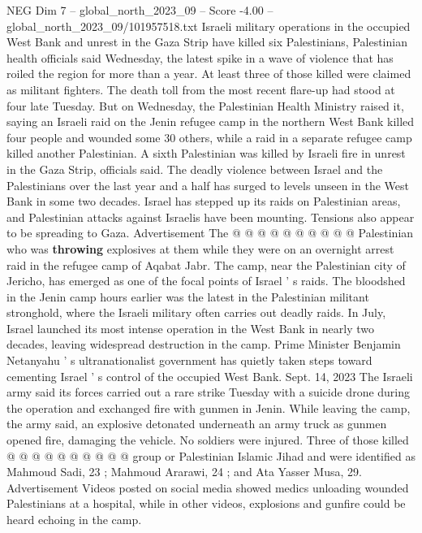 \begin{textsample}{NEG Dim 7 – global\_north\_2023\_09 – Score -4.00 – global\_north\_2023\_09/101957518.txt}  \label{ex:f7_neg_164}
Israeli military operations in the occupied West Bank and unrest in the Gaza Strip have killed six Palestinians, Palestinian health officials said Wednesday, the latest spike in a wave of violence that has roiled the region for more than a year.
At least three of those killed were claimed as militant fighters.
The death toll from the most recent flare-up had stood at four late Tuesday.
But on Wednesday, the Palestinian Health Ministry raised it, saying an Israeli raid on the Jenin refugee camp in the northern West Bank killed four people and wounded some 30 others, while a raid in a separate refugee camp killed another Palestinian.
A sixth Palestinian was killed by Israeli fire in unrest in the Gaza Strip, officials said.
The deadly violence between Israel and the Palestinians over the last year and a half has surged to levels unseen in the West Bank in some two decades.
Israel has stepped up its raids on Palestinian areas, and Palestinian attacks against Israelis have been mounting.
Tensions also appear to be spreading to Gaza.
Advertisement The @ @ @ @ @ @ @ @ @ @ Palestinian who was \textbf{throwing} explosives at them while they were on an overnight arrest raid in the refugee camp of Aqabat Jabr.
The camp, near the Palestinian city of Jericho, has emerged as one of the focal points of Israel ' s raids.
The bloodshed in the Jenin camp hours earlier was the latest in the Palestinian militant stronghold, where the Israeli military often carries out deadly raids.
In July, Israel launched its most intense operation in the West Bank in nearly two decades, leaving widespread destruction in the camp.
Prime Minister Benjamin Netanyahu ' s ultranationalist government has quietly taken steps toward cementing Israel ' s control of the occupied West Bank.
Sept. 14, 2023 The Israeli army said its forces carried out a rare strike Tuesday with a suicide drone during the operation and exchanged fire with gunmen in Jenin.
While leaving the camp, the army said, an explosive detonated underneath an army truck as gunmen opened fire, damaging the vehicle.
No soldiers were injured.
Three of those killed @ @ @ @ @ @ @ @ @ @ group or Palestinian Islamic Jihad and were identified as Mahmoud Sadi, 23 ; Mahmoud Ararawi, 24 ; and Ata Yasser Musa, 29.
Advertisement Videos posted on social media showed medics unloading wounded Palestinians at a hospital, while in other videos, explosions and gunfire could be heard echoing in the camp.

\end{textsample}
